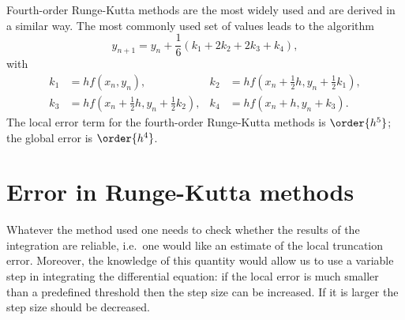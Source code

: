 Fourth-order Runge-Kutta methods are the most widely used and are
derived in a similar way. The most commonly used set of values leads
to the algorithm
%
\begin{equation}
  y_{n+1} = y_n + \frac{1}{6}(k_1+2k_2+2k_3+k_4),
  \label{IVP.eq:22}
\end{equation}
%
with
%
\begin{subequations}
\label{IVP.eq:23}
  \begin{align}
    k_1 &= h f(x_n,y_n), &
    k_2 &= h f(x_n+\frac{1}{2}h,y_n+\frac{1}{2}k_1), \\
    k_3 &= h f(x_n+\frac{1}{2}h,y_n+\frac{1}{2}k_2), &
    k_4 &= hf(x_n+h,y_n+k_3).
  \end{align}
\end{subequations}
%
The local error term for the fourth-order Runge-Kutta methods is
$\order{h^5}$; the global error is $\order{h^4}$.

\section{Error in Runge-Kutta methods}

Whatever the method used one needs to check whether the results of the
integration are reliable, i.e.\ one would like an estimate of the local
truncation error.  Moreover, the knowledge of this quantity would
allow us to use a variable step in integrating the differential
equation: if the local error is much smaller than a predefined
threshold then the step size can be increased.  If it is larger the
step size should be decreased.

